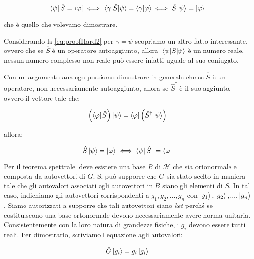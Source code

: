     \begin{equation} \label{eq:proofHard3}
        \bra{\psi} \hat{S} = \bra{\varphi} \iff \mel{\gamma}{\hat{S}}{\psi} = \braket{\gamma}{\varphi} \iff \hat{S} \ket{\psi}  = \ket{\varphi}
    \end{equation}

che \`e quello che volevamo dimostrare. 

Considerando la \eqref{eq:proofHard2} per $\gamma = \psi$ scopriamo un altro fatto interessante, ovvero che se $\hat{S}$ \`e un operatore autoaggiunto, allora $\mel{\psi}{S}{\psi}$ \`e un numero reale, nessun numero complesso non reale può essere infatti uguale al suo coniugato.

Con un argomento analogo possiamo dimostrare in generale che se $\hat{S}$ \`e un operatore, non necessariamente autoaggiunto, allora se $\hat{S} ^ \dagger$ \`e il suo aggiunto, ovvero il vettore tale che:
    
	\begin{equation}
        	\left ( \bra{\varphi} \hat{S} \right ) \ket{\psi} =
        	\bra{\varphi} \left ( \hat{S}^\dagger \ket{\psi} \right ) 
	\end{equation}

allora:
    
    \begin{equation} \label{eq:proofHardAlt}
        \hat{S} \ket{\psi} = \ket{\varphi} \iff \bra{\psi} \hat{S}^\dagger = \bra{\varphi}
    \end{equation}

Per il teorema spettrale, deve esistere una base $B$ di $\mathcal{H}$ che sia ortonormale e composta da autovettori di $G$. Si può supporre che $G$ sia stato scelto in maniera tale che gli autovalori associati agli autovettori in $B$ siano gli elementi di $S$.
In tal caso, indichiamo gli autovettori corrispondenti a $g_1, g_2, ..., g_n$ con $\ket{g_1}, \ket{g_2}, ..., \ket{g_n}$. Siamo autorizzati a supporre che tali autovettori siano \textit{ket} perché se costituiscono una base ortonormale devono necessariamente avere norma unitaria. \\
Consistentemente con la loro natura di grandezze fisiche, i $g_i$ devono essere tutti reali. Per dimostrarlo, scriviamo l'equazione agli autovalori:

    \begin{equation} \label{eq:realEigenvaluesProof0}
        \hat{G} \ket{g_i} = g_i \ket{g_i}
    \end{equation}
    
